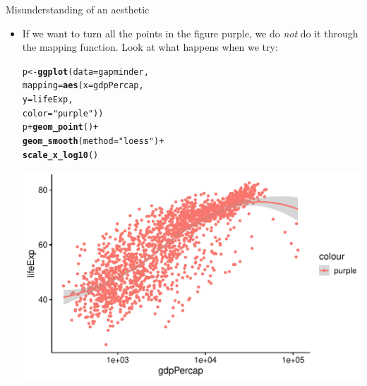 \documentclass[10pt]{beamer}\usepackage[]{graphicx}\usepackage[]{color}
\makeatletter
\def\maxwidth{ %
  \ifdim\Gin@nat@width>\linewidth
    \linewidth
  \else
    \Gin@nat@width
  \fi
}
\newcommand{\hlstr}[1]{\textcolor[rgb]{0.192,0.494,0.8}{#1}}%
\newcommand{\hlopt}[1]{\textcolor[rgb]{0,0,0}{#1}}%
\newcommand{\hlstd}[1]{\textcolor[rgb]{0.345,0.345,0.345}{#1}}%
\newcommand{\hlkwb}[1]{\textcolor[rgb]{0.69,0.353,0.396}{#1}}%
\newcommand{\hlkwc}[1]{\textcolor[rgb]{0.333,0.667,0.333}{#1}}%
\newcommand{\hlkwd}[1]{\textcolor[rgb]{0.737,0.353,0.396}{\textbf{#1}}}%
\newenvironment{kframe}{%
 \def\at@end@of@kframe{}%
 \ifinner\ifhmode%
  \def\at@end@of@kframe{\end{minipage}}%
  \begin{minipage}{\columnwidth}%
 \fi\fi%
 \def\FrameCommand##1{\hskip\@totalleftmargin \hskip-\fboxsep
 \colorbox{shadecolor}{##1}\hskip-\fboxsep
     \hskip-\linewidth \hskip-\@totalleftmargin \hskip\columnwidth}%
 \MakeFramed {\advance\hsize-\width
   \@totalleftmargin\z@ \linewidth\hsize
   \@setminipage}}%
 {\par\unskip\endMakeFramed%
 \at@end@of@kframe}
\newenvironment{knitrout}{}{} %
\makeatother
\begin{document}
\begin{frame}[fragile]{Misunderstanding of an aesthetic}
	\begin{itemize}
		\item If we want to turn all the points in the figure purple, we do \textit{not} do it through the mapping function. Look at what happens when we try:
\begin{knitrout}\tiny
{}\color{fgcolor}\begin{kframe}
\begin{alltt}
\hlstd{p} \hlkwb{<-} \hlkwd{ggplot}\hlstd{(}\hlkwc{data} \hlstd{= gapminder,}
                        \hlkwc{mapping} \hlstd{=} \hlkwd{aes}\hlstd{(}\hlkwc{x} \hlstd{= gdpPercap,}
                        \hlkwc{y} \hlstd{= lifeExp,}
                        \hlkwc{color} \hlstd{=} \hlstr{"purple"}\hlstd{))}
\hlstd{p} \hlopt{+} \hlkwd{geom_point}\hlstd{()} \hlopt{+}
        \hlkwd{geom_smooth}\hlstd{(}\hlkwc{method} \hlstd{=} \hlstr{"loess"}\hlstd{)} \hlopt{+}
        \hlkwd{scale_x_log10}\hlstd{()}
\end{alltt}
\end{kframe}

{\centering \includegraphics[width=\maxwidth]{figure/unnamed-chunk-12-1} 

}


\end{knitrout}
	\end{itemize}
	
\end{frame}
\end{document}
